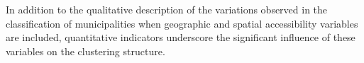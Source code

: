 \documentclass[a4paper,11pt,oneside]{article}
\begin{document}
In addition to the qualitative description of the variations observed in the classification of municipalities when geographic and spatial accessibility variables are included, quantitative indicators underscore the significant influence of these variables on the clustering structure.

\end{document}
